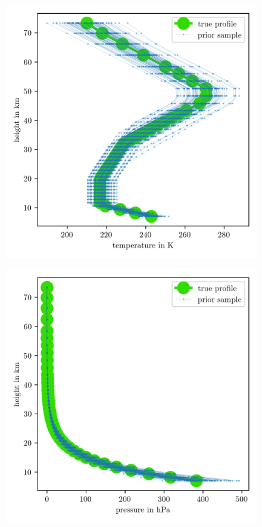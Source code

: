 \begin{figure}[ht!]
	\centering
	\includegraphics{PriorTempPostMeanSigm.png}
	\caption[]{}
	\label{fig:PriorTemp}
\end{figure}

\begin{figure}[ht!]
	\centering
	\includegraphics{PriorPressPostMeanSigm.png}
	\caption[]{}
	\label{fig:PriorPress}
\end{figure}


